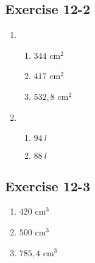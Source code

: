 \subsection{Exercise 12-2} %
\begin{enumerate}[noitemsep, label=\textbf{\arabic*}. ] 
\item %
 \begin{enumerate}[noitemsep, label=\textbf{(\alph*)} ]
  \item $344$ cm$^2$
\item  $417$ cm$^2$
\item  $532,8$ cm$^2$
 \end{enumerate}


\item %
 \begin{enumerate}[noitemsep, label=\textbf{(\alph*)} ]
\item $94~ l$ %
\item $88 ~l$%
\end{enumerate}


 \end{enumerate}       
\subsection{Exercise 12-3} %
\begin{enumerate}[itemsep=6pt, label=\textbf{\arabic*}. ] 
\item $420$ cm$^3$
\item $500$ cm$^3$
\item $785,4$ cm$^3$
\end{enumerate}
